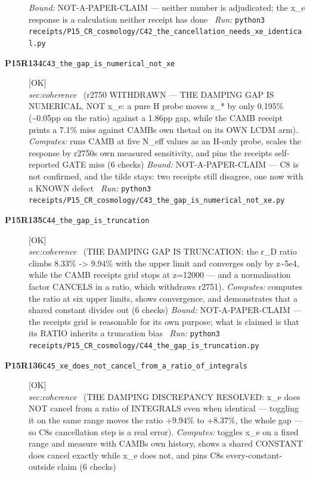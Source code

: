 \begin{description}
 \emph{Bound:} NOT-A-PAPER-CLAIM --- neither number is adjudicated; the x\_e response is a calculation neither receipt has done
\ \emph{Run:} \texttt{python3 receipts/P15\_CR\_cosmology/C42\_the\_cancellation\_needs\_xe\_identical.py}
\item[\rcptlabel{C43_the_gap_is_numerical_not_xe}{P15R134}\textbf{P15R134}\quad\texttt{C43\_the\_gap\_is\_numerical\_not\_xe}]\hfill\textsf{[OK]}\\
\textit{sec:coherence} \ (r2750 WITHDRAWN --- THE DAMPING GAP IS NUMERICAL, NOT x\_e: a pure H probe moves z\_* by only 0.195\% (\textasciitilde{}0.05pp on the ratio) against a 1.86pp gap, while the CAMB receipt prints a 7.1\% miss against CAMBs own thetad on its OWN LCDM arm). 
\emph{Computes:} runs CAMB at five N\_eff values as an H-only probe, scales the response by r2750s own measured sensitivity, and pins the receipts self-reported GATE miss (6 checks)
 \emph{Bound:} NOT-A-PAPER-CLAIM --- C8 is not confirmed, and the tilde stays: two receipts still disagree, one now with a KNOWN defect
\ \emph{Run:} \texttt{python3 receipts/P15\_CR\_cosmology/C43\_the\_gap\_is\_numerical\_not\_xe.py}
\item[\rcptlabel{C44_the_gap_is_truncation}{P15R135}\textbf{P15R135}\quad\texttt{C44\_the\_gap\_is\_truncation}]\hfill\textsf{[OK]}\\
\textit{sec:coherence} \ (THE DAMPING GAP IS TRUNCATION: the r\_D ratio climbs 8.33\% -> 9.94\% with the upper limit and converges only by z\textasciitilde{}5e4, while the CAMB receipts grid stops at z=12000 --- and a normalisation factor CANCELS in a ratio, which withdraws r2751). 
\emph{Computes:} computes the ratio at six upper limits, shows convergence, and demonstrates that a shared constant divides out (6 checks)
 \emph{Bound:} NOT-A-PAPER-CLAIM --- the receipts grid is reasonable for its own purpose; what is claimed is that its RATIO inherits a truncation bias
\ \emph{Run:} \texttt{python3 receipts/P15\_CR\_cosmology/C44\_the\_gap\_is\_truncation.py}
\item[\rcptlabel{C45_xe_does_not_cancel_from_a_ratio_of_integrals}{P15R136}\textbf{P15R136}\quad\texttt{C45\_xe\_does\_not\_cancel\_from\_a\_ratio\_of\_integrals}]\hfill\textsf{[OK]}\\
\textit{sec:coherence} \ (THE DAMPING DISCREPANCY RESOLVED: x\_e does NOT cancel from a ratio of INTEGRALS even when identical --- toggling it on the same range moves the ratio +9.94\% to +8.37\%, the whole gap --- so C8s cancellation step is a real error). 
\emph{Computes:} toggles x\_e on a fixed range and measure with CAMBs own history, shows a shared CONSTANT does cancel exactly while x\_e does not, and pins C8s every-constant-outside claim (6 checks)

\end{description}
